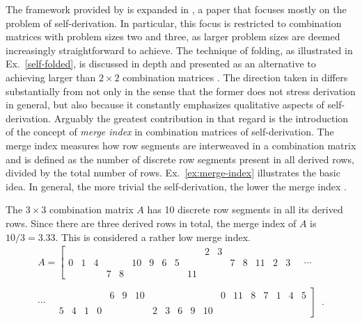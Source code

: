 The framework provided by \cite{Starr1984} is expanded in \cite{Kowalski1987a}, a paper that focuses mostly on the problem of self-derivation. In particular, this focus is restricted to combination matrices with problem sizes two and three, as larger problem sizes are deemed increasingly straightforward to achieve. The technique of folding, as illustrated in Ex.~\ref{self-folded}, is discussed in depth and presented as an alternative to achieving larger than $2 \times 2$ combination matrices \cite[298]{Kowalski1987a}. The direction taken in \cite{Kowalski1987a} differs substantially from \cite{Starr1984} not only in the sense that the former does not stress derivation in general, but also because it constantly emphasizes qualitative aspects of self-derivation. Arguably the greatest contribution in that regard is the introduction of the concept of \emph{merge index} in combination matrices of self-derivation. The merge index measures how row segments are interweaved in a combination matrix and is defined as the number of discrete row segments present in all derived rows, divided by the total number of rows. Ex.~\ref{ex:merge-index} illustrates the basic idea. In general, the more trivial the self-derivation, the lower the merge index \cite[310]{Kowalski1987a}.

\begin{example}
	\cite[314]{Kowalski1987a}
	\label{ex:merge-index}
    The $3 \times 3$ combination matrix $A$ has 10 discrete row segments in all its derived rows. Since there are three derived rows in total, the merge index of $A$ is $10 / 3 = 3.33$. This is considered a rather low merge index.
    \begin{multline}
        A = \left[
        \begin{array}{cccccccccccc|ccccc}
        &&&&&&&&&& 2 & 3 &&&&& \\
        0 & 1 & 4 &&& 10 & 9 & 6 & 5 &&&& 7 & 8 & 11 & 2 & 3 \\
        &&& 7 & 8 &&&&& 11 &&&&&&&
        \end{array}
        \right. \quad \cdots \\\\
        \cdots \left. \quad
        \begin{array}{ccccccc|cccccccccccc}
        &&&& 6 & 9 & 10 &&&&&& 0 & 11 & 8 & 7 & 1 & 4 & 5 \\
        &&&&&&&&&&&&&&&&&& \\
        5 & 4 & 1 & 0 &&&& 2 & 3 & 6 & 9 & 10 &&&&&&&
        \end{array}
        \right] \enspace.
    \end{multline}
\end{example}

